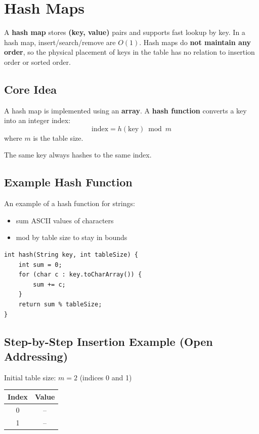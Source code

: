 \section{Hash Maps}

A \textbf{hash map} stores \textbf{(key, value)} pairs and supports fast lookup by key.  
In a hash map, insert/search/remove are \textbf{$O(1)$}. Hash maps do \textbf{not maintain any order}, so the physical placement of keys in the table has no relation to insertion order or sorted order.

\subsection{Core Idea}
A hash map is implemented using an \textbf{array}. 
A \textbf{hash function} converts a key into an integer index:
\[
\text{index} = h(\text{key}) \bmod m
\]
where $m$ is the table size.

The same key always hashes to the same index.

\subsection{Example Hash Function}
An example of a hash function for strings:
\begin{itemize}
  \item sum ASCII values of characters
  \item mod by table size to stay in bounds
\end{itemize}

\begin{verbatim}
int hash(String key, int tableSize) {
    int sum = 0;
    for (char c : key.toCharArray()) {
        sum += c;
    }
    return sum % tableSize;
}
\end{verbatim}

\subsection{Step-by-Step Insertion Example (Open Addressing)}

Initial table size: $m = 2$ (indices 0 and 1)

\begin{center}
\begin{tabular}{c c}
\toprule
Index & Value \\
\midrule
0 & -- \\
1 & -- \\
\bottomrule
\end{tabular}
\end{center}

